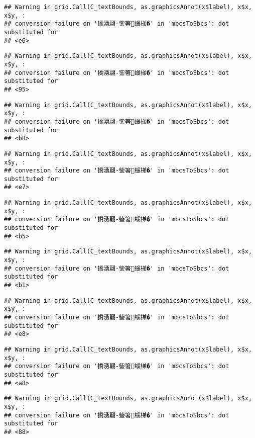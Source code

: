 \documentclass[
]{article}
\begin{document}
\begin{verbatim}
## Warning in grid.Call(C_textBounds, as.graphicsAnnot(x$label), x$x, x$y, :
## conversion failure on '撟湧翩-鈭箸蝯梯�' in 'mbcsToSbcs': dot substituted for
## <e6>
\end{verbatim}

\begin{verbatim}
## Warning in grid.Call(C_textBounds, as.graphicsAnnot(x$label), x$x, x$y, :
## conversion failure on '撟湧翩-鈭箸蝯梯�' in 'mbcsToSbcs': dot substituted for
## <95>
\end{verbatim}

\begin{verbatim}
## Warning in grid.Call(C_textBounds, as.graphicsAnnot(x$label), x$x, x$y, :
## conversion failure on '撟湧翩-鈭箸蝯梯�' in 'mbcsToSbcs': dot substituted for
## <b8>
\end{verbatim}

\begin{verbatim}
## Warning in grid.Call(C_textBounds, as.graphicsAnnot(x$label), x$x, x$y, :
## conversion failure on '撟湧翩-鈭箸蝯梯�' in 'mbcsToSbcs': dot substituted for
## <e7>
\end{verbatim}

\begin{verbatim}
## Warning in grid.Call(C_textBounds, as.graphicsAnnot(x$label), x$x, x$y, :
## conversion failure on '撟湧翩-鈭箸蝯梯�' in 'mbcsToSbcs': dot substituted for
## <b5>
\end{verbatim}

\begin{verbatim}
## Warning in grid.Call(C_textBounds, as.graphicsAnnot(x$label), x$x, x$y, :
## conversion failure on '撟湧翩-鈭箸蝯梯�' in 'mbcsToSbcs': dot substituted for
## <b1>
\end{verbatim}

\begin{verbatim}
## Warning in grid.Call(C_textBounds, as.graphicsAnnot(x$label), x$x, x$y, :
## conversion failure on '撟湧翩-鈭箸蝯梯�' in 'mbcsToSbcs': dot substituted for
## <e8>
\end{verbatim}

\begin{verbatim}
## Warning in grid.Call(C_textBounds, as.graphicsAnnot(x$label), x$x, x$y, :
## conversion failure on '撟湧翩-鈭箸蝯梯�' in 'mbcsToSbcs': dot substituted for
## <a8>
\end{verbatim}

\begin{verbatim}
## Warning in grid.Call(C_textBounds, as.graphicsAnnot(x$label), x$x, x$y, :
## conversion failure on '撟湧翩-鈭箸蝯梯�' in 'mbcsToSbcs': dot substituted for
## <88>
\end{verbatim}
\end{document}
